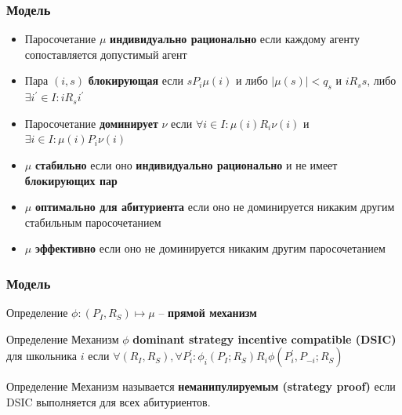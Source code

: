\documentclass[10pt,pdf,hyperref={unicode}]{beamer}
\begin{document}
\begin{frame}
    \frametitle{Модель}
    \begin{itemize}
        \item Паросочетание $\mu$ {\bf индивидуально рационально} если каждому агенту сопоставляется допустимый агент
        \item Пара $(i, s)$ {\bf блокирующая} если $s P_i \mu(i)$ и либо $|\mu(s)| < q_s$ и $i R_s s$, либо  $\exists i^\prime \in I: i R_s i^\prime$
        \item Паросочетание {\bf доминирует} $\nu$ если $\forall i \in I: \mu(i) R_i \nu(i)$ и $\exists i \in I: \mu(i) P_i \nu(i)$
        \item $\mu$ {\bf стабильно} если оно {\bf индивидуально рационально} и не имеет {\bf блокирующих пар}
        \item $\mu$ {\bf оптимально для абитуриента} если оно не доминируется никаким другим стабильным паросочетанием
        \item $\mu$ {\bf эффективно} если оно не доминируется никаким другим паросочетанием
    \end{itemize}
\end{frame}

\begin{frame}
    \frametitle{Модель}
    \begin{block}{Определение}
        $\phi: (P_I, R_S) \longmapsto \mu$ -- {\bf прямой механизм} 
    \end{block}

    \begin{block}{Определение}
        Механизм $\phi$ {\bf dominant strategy incentive compatible (DSIC)} для школьника $i$ если $\forall (R_I, R_S), \forall P_i^\prime: \phi_i(P_I; R_S) R_i \phi(P_i^\prime, P_{-i}; R_S)$
    \end{block}

    \begin{block}{Определение}
        Механизм называется {\bf неманипулируемым (strategy proof)} если DSIC выполняется для всех абитуриентов.
    \end{block}
\end{frame}
\end{document}
